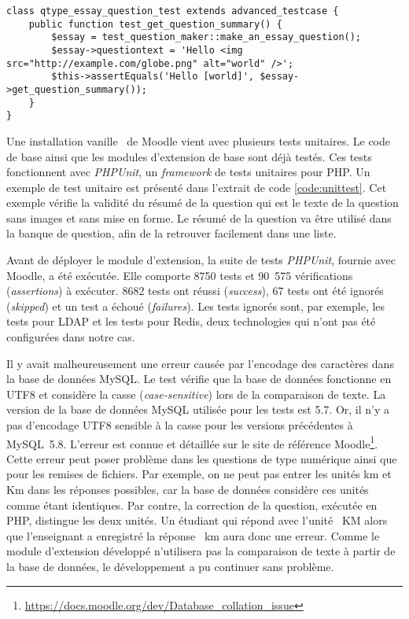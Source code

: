 \begin{lstfloat}[htbp]
\begin{lstlisting}[frame=l]
class qtype_essay_question_test extends advanced_testcase {
    public function test_get_question_summary() {
        $essay = test_question_maker::make_an_essay_question();
        $essay->questiontext = 'Hello <img src="http://example.com/globe.png" alt="world" />';
        $this->assertEquals('Hello [world]', $essay->get_question_summary());
    }
}
\end{lstlisting}
\caption{Exemple de test unitaire du module d'extension \texttt{qtype\_essay}.}
\label{code:unittest}
\end{lstfloat}

Une installation \og vanille \fg\ de Moodle vient avec plusieurs tests unitaires.
Le code de base ainsi que les modules d'extension de base sont d\'ej\`a test\'es.
Ces tests fonctionnent avec \textit{PHPUnit}, un \textit{framework} de tests unitaires pour PHP.
Un exemple de test unitaire est pr\'esent\'e dans l'extrait de code \ref{code:unittest}.
Cet exemple v\'erifie la validit\'e du r\'esum\'e de la question qui est le texte de la question sans images et sans mise en forme.
Le r\'esum\'e de la question va \^etre utilis\'e dans la banque de question, afin de la retrouver facilement dans une liste.


Avant de d\'eployer le module d'extension, la suite de tests \textit{PHPUnit}, fournie avec Moodle, a \'et\'e ex\'ecut\'ee.
Elle comporte 8750 tests et 90~575 v\'erifications (\textit{assertions}) \`a ex\'ecuter.
8682 tests ont r\'eussi (\textit{success}), 67 tests ont \'et\'e ignor\'es (\textit{skipped}) et un test a \'echou\'e (\textit{failures}).
Les tests ignor\'es sont, par exemple, les tests pour LDAP et les tests pour Redis, deux technologies qui n'ont pas \'et\'e configur\'ees dans notre cas.

Il y avait malheureusement une erreur caus\'ee par l'encodage des caract\`eres dans la base de donn\'ees MySQL.
Le test v\'erifie que la base de donn\'ees fonctionne en UTF8 et consid\`ere la casse (\textit{case-sensitive}) lors de la comparaison de texte.
La version de la base de donn\'ees MySQL utilis\'ee pour les tests est 5.7.
Or, il n'y a pas d'encodage UTF8 sensible \`a la casse pour les versions pr\'ec\'edentes \`a MySQL~5.8.
L'erreur est connue et d\'etaill\'ee sur le site de r\'ef\'erence Moodle\footnote{\url{https://docs.moodle.org/dev/Database_collation_issue}}.
Cette erreur peut poser probl\`eme dans les questions de type num\'erique ainsi que pour les remises de fichiers.
Par exemple, on ne peut pas entrer les unit\'es \og km \fg{} et \og Km \fg{} dans les r\'eponses possibles, car la base de donn\'ees consid\`ere ces unit\'es comme \'etant identiques.
Par contre, la correction de la question, ex\'ecut\'ee en PHP, distingue les deux unit\'es.
Un \'etudiant qui r\'epond avec l'unit\'e ~KM \fg{} alors que l'enseignant a enregistr\'e la r\'eponse ~km \fg{} aura donc une erreur.
Comme le module d'extension d\'evelopp\'e n'utilisera pas la comparaison de texte \`a partir de la base de donn\'ees, le d\'eveloppement a pu continuer sans probl\`eme.

